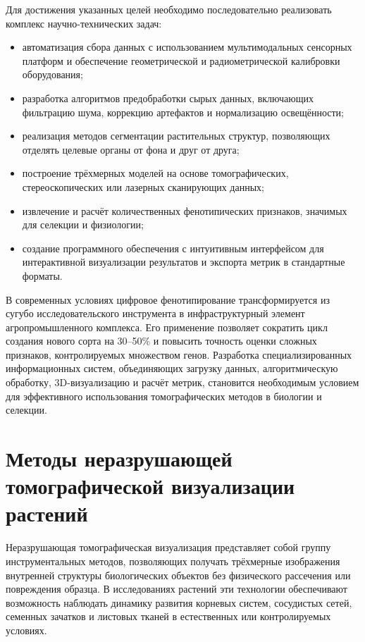 \documentclass[14pt,a4paper]{extreport}
\begin{document}
Для достижения указанных целей необходимо последовательно реализовать комплекс научно-технических задач:
\begin{itemize}
  \item автоматизация сбора данных с использованием мультимодальных сенсорных платформ и обеспечение геометрической и радиометрической калибровки оборудования;
  \item разработка алгоритмов предобработки сырых данных, включающих фильтрацию шума, коррекцию артефактов и нормализацию освещённости;
  \item реализация методов сегментации растительных структур, позволяющих отделять целевые органы от фона и друг от друга;
  \item построение трёхмерных моделей на основе томографических, стереоскопических или лазерных сканирующих данных;
  \item извлечение и расчёт количественных фенотипических признаков, значимых для селекции и физиологии;
  \item создание программного обеспечения с интуитивным интерфейсом для интерактивной визуализации результатов и экспорта метрик в стандартные форматы.
\end{itemize}

В современных условиях цифровое фенотипирование трансформируется из сугубо исследовательского инструмента в инфраструктурный элемент агропромышленного комплекса. Его применение позволяет сократить цикл создания нового сорта на 30--50\% и повысить точность оценки сложных признаков, контролируемых множеством генов. Разработка специализированных информационных систем, объединяющих загрузку данных, алгоритмическую обработку, 3D-визуализацию и расчёт метрик, становится необходимым условием для эффективного использования томографических методов в биологии и селекции.

\section{Методы неразрушающей томографической визуализации растений}

Неразрушающая томографическая визуализация представляет собой группу инструментальных методов, позволяющих получать трёхмерные изображения внутренней структуры биологических объектов без физического рассечения или повреждения образца. В исследованиях растений эти технологии обеспечивают возможность наблюдать динамику развития корневых систем, сосудистых сетей, семенных зачатков и листовых тканей в естественных или контролируемых условиях.
\end{document}
